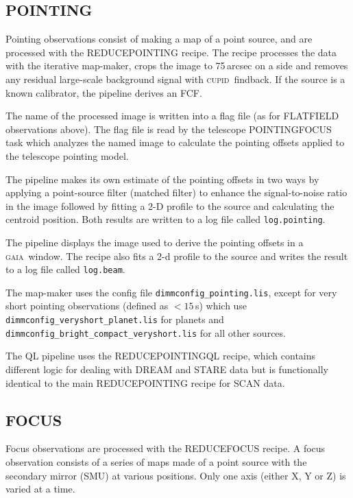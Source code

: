 \documentclass[twoside,11pt]{article}
\renewcommand{\_}{\texttt{\symbol{95}}}
\newcommand{\CUPID}{\textsc{cupid}}
\newcommand{\GAIA}{\textsc{gaia}}
\newcommand{\task}[1]{\textsf{#1}}
\begin{document}
\subsection{POINTING}

Pointing observations consist of making a map of a point source, and
are processed with the \task{REDUCE\_POINTING} recipe. The recipe
processes the data with the iterative map-maker, crops the image to
75\,arcsec on a side and removes any residual large-scale background
signal with \CUPID\ \task{findback}. If the source is a known
calibrator, the pipeline derives an FCF.

The name of the processed image is written into a flag file (as for
FLATFIELD observations above). The flag file is read by the telescope
POINTING\_FOCUS task which analyzes the named image to calculate the
pointing offsets applied to the telescope pointing model.

The pipeline makes its own estimate of the pointing offsets in two
ways by applying a point-source filter (matched filter) to enhance the
signal-to-noise ratio in the image followed by fitting a 2-D profile
to the source and calculating the centroid position. Both results are
written to a log file called \verb+log.pointing+.

The pipeline displays the image used to derive the pointing offsets in
a \GAIA\ window. The recipe also fits a 2-d profile to the source and
writes the result to a log file called \verb+log.beam+.

The map-maker uses the config file \verb+dimmconfig_pointing.lis+,
except for very short pointing observations (defined as $<15$\,s)
which use \verb+dimmconfig_veryshort_planet.lis+ for planets and
\verb+dimmconfig_bright_compact_veryshort.lis+ for all other sources.

The QL pipeline uses the \task{REDUCE\_POINTING\_QL} recipe, which
contains different logic for dealing with DREAM and STARE data but is
functionally identical to the main \task{REDUCE\_POINTING} recipe for
SCAN data.

\subsection{FOCUS}

Focus observations are processed with the \task{REDUCE\_FOCUS}
recipe. A focus observation consists of a series of maps made of a
point source with the secondary mirror (SMU) at various
positions. Only one axis (either X, Y or Z) is varied at a time.
\end{document}
